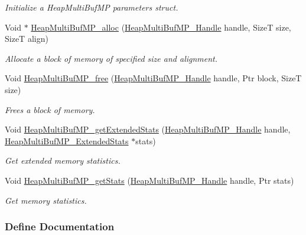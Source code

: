 \begin{DoxyCompactItemize}
\begin{DoxyCompactList}\small\item\em Initialize a HeapMultiBufMP parameters struct. \item\end{DoxyCompactList}\item 
Void $\ast$ \hyperlink{_heap_multi_buf_m_p_8h_a7a9a09acb3e7d1c942f1535f00bbad1e}{HeapMultiBufMP\_\-alloc} (\hyperlink{_heap_multi_buf_m_p_8h_a84a0dbef1eb25a19072649a3c30ed4e6}{HeapMultiBufMP\_\-Handle} handle, SizeT size, SizeT align)
\begin{DoxyCompactList}\small\item\em Allocate a block of memory of specified size and alignment. \item\end{DoxyCompactList}\item 
Void \hyperlink{_heap_multi_buf_m_p_8h_a1df398e57eed0e1fa1aa1035107adcbf}{HeapMultiBufMP\_\-free} (\hyperlink{_heap_multi_buf_m_p_8h_a84a0dbef1eb25a19072649a3c30ed4e6}{HeapMultiBufMP\_\-Handle} handle, Ptr block, SizeT size)
\begin{DoxyCompactList}\small\item\em Frees a block of memory. \item\end{DoxyCompactList}\item 
Void \hyperlink{_heap_multi_buf_m_p_8h_a386420101752537b59e12520aafd9b0d}{HeapMultiBufMP\_\-getExtendedStats} (\hyperlink{_heap_multi_buf_m_p_8h_a84a0dbef1eb25a19072649a3c30ed4e6}{HeapMultiBufMP\_\-Handle} handle, \hyperlink{struct_heap_multi_buf_m_p___extended_stats}{HeapMultiBufMP\_\-ExtendedStats} $\ast$stats)
\begin{DoxyCompactList}\small\item\em Get extended memory statistics. \item\end{DoxyCompactList}\item 
Void \hyperlink{_heap_multi_buf_m_p_8h_ad1cbb150d20f6c9e12f8c5e13ab70c61}{HeapMultiBufMP\_\-getStats} (\hyperlink{_heap_multi_buf_m_p_8h_a84a0dbef1eb25a19072649a3c30ed4e6}{HeapMultiBufMP\_\-Handle} handle, Ptr stats)
\begin{DoxyCompactList}\small\item\em Get memory statistics. \item\end{DoxyCompactList}\end{DoxyCompactItemize}


\subsubsection{Define Documentation}
